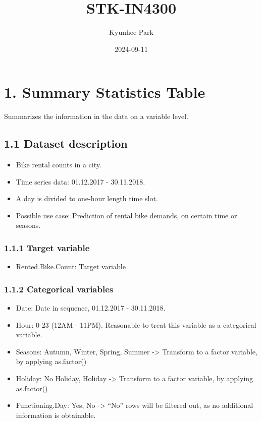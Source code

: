 \documentclass[
]{article}
\title{STK-IN4300}
\author{Kyunhee Park}
\date{2024-09-11}
\providecommand{\tightlist}{%
  \setlength{\itemsep}{0pt}\setlength{\parskip}{0pt}}
\begin{document}
\maketitle

\hypertarget{summary-statistics-table}{%
\section{1. Summary Statistics Table}\label{summary-statistics-table}}

Summarizes the information in the data on a variable level.

\hypertarget{dataset-description}{%
\subsection{1.1 Dataset description}\label{dataset-description}}

\begin{itemize}
\tightlist
\item
  Bike rental counts in a city.
\item
  Time series data: 01.12.2017 - 30.11.2018.
\item
  A day is divided to one-hour length time slot.
\item
  Possible use case: Prediction of rental bike demands, on certain time
  or seasons.
\end{itemize}

\hypertarget{target-variable}{%
\subsubsection{1.1.1 Target variable}\label{target-variable}}

\begin{itemize}
\tightlist
\item
  Rented.Bike.Count: Target variable
\end{itemize}

\hypertarget{categorical-variables}{%
\subsubsection{1.1.2 Categorical
variables}\label{categorical-variables}}

\begin{itemize}
\tightlist
\item
  Date: Date in sequence, 01.12.2017 - 30.11.2018.
\item
  Hour: 0-23 (12AM - 11PM). Reasonable to treat this variable as a
  categorical variable.
\item
  Seasons: Autumn, Winter, Spring, Summer -\textgreater{} Transform to a
  factor variable, by applying as.factor()
\item
  Holiday: No Holiday, Holiday -\textgreater{} Transform to a factor
  variable, by applying as.factor()
\item
  Functioning.Day: Yes, No -\textgreater{} ``No'' rows will be filtered
  out, as no additional information is obtainable.
\end{itemize}
\end{document}
